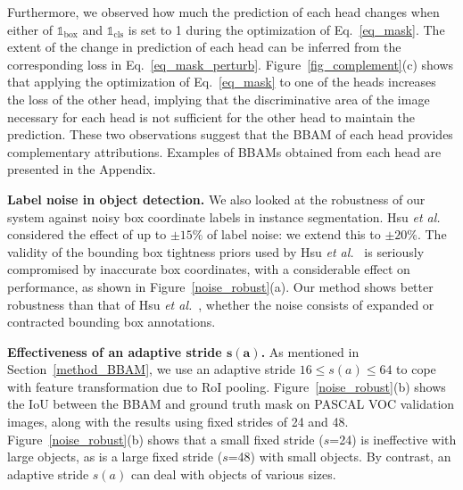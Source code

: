 \documentclass[final]{cvpr}
\begin{document}
Furthermore, we observed how much the prediction of each head changes when either of $\mathbb{1}_{\text{box}}$ and $\mathbb{1}_{\text{cls}}$ is set to 1 during the optimization of Eq.~\ref{eq_mask}.
The extent of the change in prediction of each head can be inferred from the corresponding loss in Eq.~\ref{eq_mask_perturb}. Figure~\ref{fig_complement}(c) shows that applying the optimization of Eq.~\ref{eq_mask} to one of the heads increases the loss of the other head, implying that the discriminative area of the image necessary for each head is not sufficient for the other head to maintain the prediction.
These two observations suggest that the BBAM of each head provides complementary attributions. Examples of BBAMs obtained from each head are presented in the Appendix.




\textbf{Label noise in object detection.} We also looked at the robustness of our system against noisy box coordinate labels in instance segmentation. 
Hsu \textit{et al.}~\cite{hsu2019weakly} considered the effect of up to $\pm15\%$ of label noise: we extend this to $\pm20\%$. 
The validity of the bounding box tightness priors used by Hsu \textit{et al.}~\cite{hsu2019weakly} is seriously compromised by inaccurate box coordinates, with a considerable effect on performance, as shown in Figure~\ref{noise_robust}(a).
Our method shows better robustness than that of Hsu \textit{et al.}~\cite{hsu2019weakly}, whether the noise consists of expanded or contracted bounding box annotations.

\textbf{Effectiveness of an adaptive stride $\boldsymbol{s(a)}$.}
As mentioned in Section~\ref{method_BBAM}, we use an adaptive stride $16 \leq s(a) \leq 64$ to cope with feature transformation due to RoI pooling.
Figure~\ref{noise_robust}(b) shows the IoU between the BBAM and ground truth mask on PASCAL VOC validation images, along with the results using fixed strides of 24 and 48.
Figure~\ref{noise_robust}(b) shows that a small fixed stride ($s$=24) is ineffective with large objects, as is a large fixed stride ($s$=48) with small objects. By contrast, an adaptive stride $s(a)$ can deal with objects of various sizes.
\end{document}
